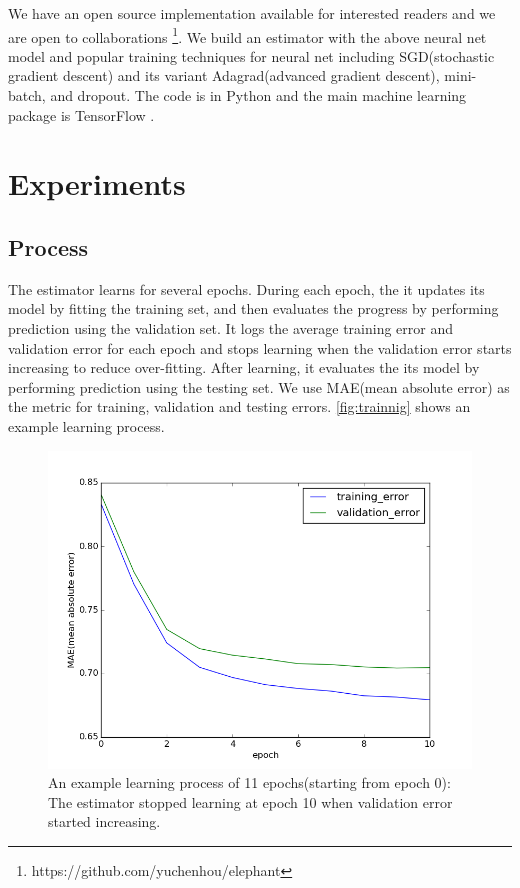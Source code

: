\documentclass{article}
\begin{document}
We have an open source implementation available for interested readers and we 
are open to collaborations \footnote{https://github.com/yuchenhou/elephant}.
We build an estimator with the above neural net model and popular training 
techniques for neural net including SGD(stochastic gradient descent) and its 
variant Adagrad(advanced gradient descent), mini-batch, and dropout.
The code is in Python and the main machine learning package is TensorFlow 
\cite{tensorflow2015-whitepaper}.

\section{Experiments}

\subsection{Process}
The estimator learns for several epochs.
During each epoch, the it updates its model by fitting the training set, and 
then evaluates the progress by performing prediction using the validation set.
It logs the average training error and validation error for each epoch and 
stops learning when the validation error starts increasing to reduce 
over-fitting.
After learning, it evaluates the its model by performing prediction using the 
testing set.
We use MAE(mean absolute error) as the metric for training, validation and 
testing errors.
\autoref{fig:trainnig} shows an example learning process.
\begin{figure}[h]
	\centering
	\includegraphics[width=0.5\linewidth]{training}
	\caption{An example learning process of 11 epochs(starting from epoch 0): 
	The estimator stopped learning at epoch 10 when validation error started 
	increasing.}
	\label{fig:trainnig}
\end{figure}
\end{document}
